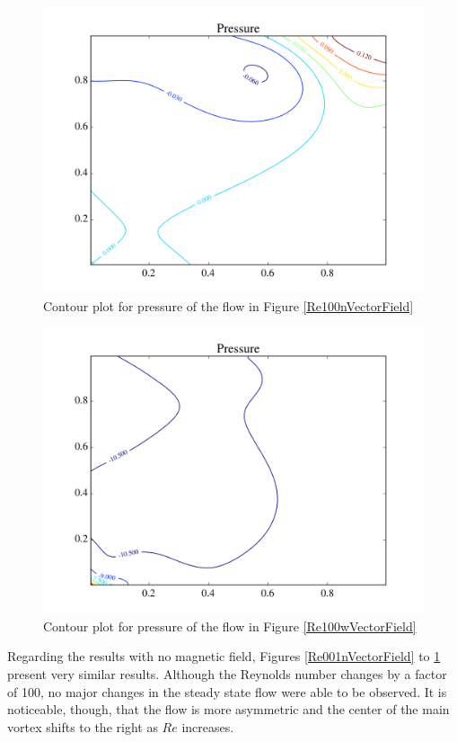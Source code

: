 \documentclass[journal]{IEEEtran}
\begin{document}
\begin{figure}[!t]
\centering
\includegraphics[width=\linewidth]{figures/Re100/n/pressure}
\caption{Contour plot for pressure of the flow in Figure \ref{Re100nVectorField}\label{Re100nPressure}}
\end{figure}


\begin{figure}[!t]
\centering
\includegraphics[width=\linewidth]{figures/Re100/w/pressure}
\caption{Contour plot for pressure of the flow in Figure \ref{Re100wVectorField} \label{Re100wPressure}}
\end{figure}

Regarding the results with no magnetic field, Figures \ref{Re001nVectorField} to \ref{Re100nPressure} present very similar results. Although the Reynolds number changes by a factor of 100, no major changes in the steady state flow were able to be observed. It is noticeable, though, that the flow is more asymmetric and the center of the main vortex shifts to the right as $\mathit{Re}$ increases.
\end{document}
